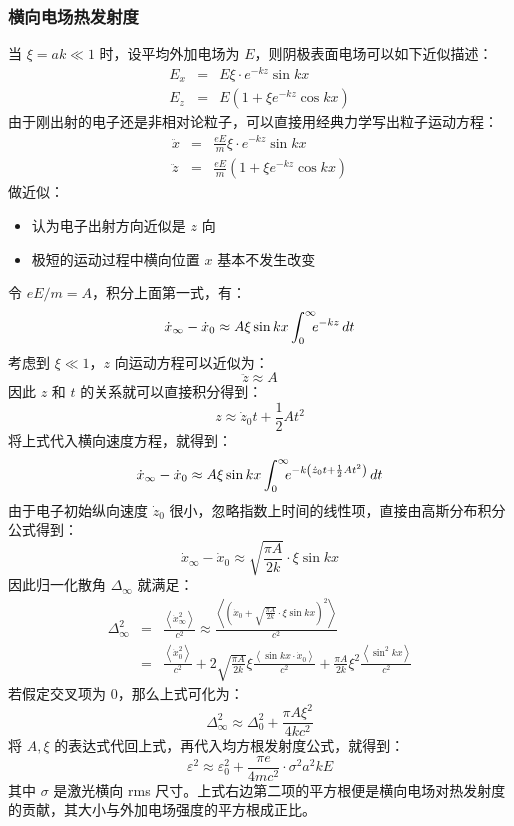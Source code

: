 \subsubsection{横向电场热发射度}
当 $\xi=ak\ll 1$ 时，设平均外加电场为 $E$，则阴极表面电场可以如下近似描述：
\begin{eqnarray*}
E_x &=& E\xi\cdot e^{-kz}\sin kx \\
E_z &=& E\left(1+\xi e^{-kz}\cos kx\right)
\end{eqnarray*}
由于刚出射的电子还是非相对论粒子，可以直接用经典力学写出粒子运动方程：
\begin{eqnarray*}
\ddot{x} &=& \frac{eE}{m}\xi\cdot e^{-kz}\sin kx \\
\ddot{z} &=& \frac{eE}{m}\left(1+\xi e^{-kz}\cos kx\right)
\end{eqnarray*}
做近似：
\begin{itemize}
\item 认为电子出射方向近似是 $z$ 向
\item 极短的运动过程中横向位置 $x$ 基本不发生改变
\end{itemize}
令 $eE/m=A$，积分上面第一式，有：
\[
	\dot{x}_{\infty} - \dot{x}_0 \approx A\xi\sin kx\int_0^{\infty}\!\!\! e^{-kz}\,dt
\]
考虑到 $\xi \ll 1$，$z$ 向运动方程可以近似为：
\[
\ddot{z}\approx A
\]
因此 $z$ 和 $t$ 的关系就可以直接积分得到：
\[
z\approx \dot{z}_0 t + \dfrac{1}{2}At^2
\]
将上式代入横向速度方程，就得到：
\[
	\dot{x}_{\infty} - \dot{x}_0 \approx A\xi\sin kx\int_0^{\infty}\!\!\! e^{-k\left(\dot{z}_0 t + \frac{1}{2}At^2\right)}\,dt
\]
由于电子初始纵向速度 $\dot{z}_0$ 很小，忽略指数上时间的线性项，直接由高斯分布积分公式得到：
\[
	\dot{x}_{\infty} - \dot{x}_0 \approx \sqrt{\frac{\pi A}{2k}}\cdot\xi\sin kx
\]
因此归一化散角 $\Delta_{\infty}$ 就满足：
\begin{eqnarray*}
\Delta_{\infty}^2 &=& \frac{\left\langle\dot{x}_{\infty}^2\right\rangle}{c^2} \approx \frac{\left\langle\left(\dot{x}_0 + \sqrt{\frac{\pi A}{2k}}\cdot\xi\sin kx\right)^2\right\rangle}{c^2} \\
	&=& \frac{\left\langle\dot{x}_{0}^2\right\rangle}{c^2} + 2\sqrt{\frac{\pi A}{2k}}\xi\frac{\left\langle\sin kx\cdot\dot{x}_{0}\right\rangle}{c^2} + \frac{\pi A}{2k}\xi^2\frac{\left\langle\sin^2 kx\right\rangle}{c^2}
\end{eqnarray*}
若假定交叉项为 0，那么上式可化为：
\[
	\Delta_{\infty}^2 \approx \Delta_{0}^2 + \frac{\pi A\xi^2}{4kc^2}
\]
将 $A,\xi$ 的表达式代回上式，再代入均方根发射度公式，就得到：
\[
	\varepsilon^2 \approx \varepsilon_{0}^2 + \frac{\pi e}{4mc^2}\cdot \sigma^2a^2kE
\]
其中 $\sigma$ 是激光横向 rms 尺寸。上式右边第二项的平方根便是横向电场对热发射度的贡献，其大小与外加电场强度的平方根成正比。

